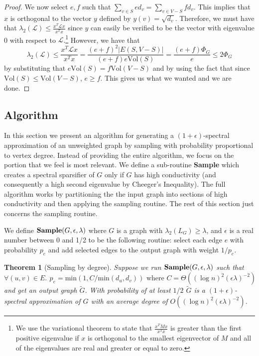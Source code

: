 \documentclass[12pt,twoside]{article}
\newtheorem{thm}{Theorem}
\begin{document}
\begin{proof}
We now select $e,f$ such that $\sum_{v \in S} e d_v = \sum_{v \in V-S} f d_v$. This implies that $x$ is orthogonal to the vector $y$ defined by $y(v) = \sqrt{d_v}$. Therefore, we must have that $\lambda_2(\mathcal{L}) \leq \frac{x^T \mathcal{L} x}{x^T x} $ since $y$ can easily be verified to be the vector with eigenvalue 0 with respect to $\mathcal{L}$.\footnote{We use the variational theorem to state that $\frac{x^T M x}{x^Tx}$ is greater than the first positive eigenvalue if $x$ is orthogonal to the smallest eigenvector of $M$ and all of the eigenvalues are real and greater or equal to zero.} However, we have that
%
\begin{equation}
\lambda_2(\mathcal{L}) \leq \frac{x^T\mathcal{L}x}{x^Tx}  
    = \frac{(e+f)^2|E(S,V-S)|}{(e + f)e\text{Vol}(S)}
    = \frac{(e+f)\Phi_G}{e} \leq 2\Phi_G
\end{equation}
%
by substituting that $e\text{Vol}(S) = f\text{Vol}(V-S)$ and by using the fact that since $\text{Vol}(S) \leq \text{Vol}(V - S)$, $e \geq f$. This gives us what we wanted and we are done.
 

\end{proof}


\subsection{Algorithm}

In this section we present an algorithm for generating a $(1+\epsilon)$-spectral approximation of an unweighted graph by sampling with probability proportional to vertex degree. Instead of providing the entire algorithm, we focus on the portion that we feel is most relevant. We define a sub-routine \textbf{Sample} which creates a spectral sparsifier of $G$ only if $G$ has high conductivity (and consequently a high second eigenvalue by Cheeger's Inequality). The full algorithm works by partitioning the the input graph into sections of high conductivity and then applying the sampling routine. The rest of this section just concerns the sampling routine.

We define $\text{\textbf{Sample}}(G, \epsilon, \lambda)$ where $G$ is a graph with $\lambda_2(L_G) \geq \lambda$, and $\epsilon$ is a real number between 0 and 1/2 to be the following routine: select each edge $e$ with probability $p_e$ and add selected edges to the output graph with weight $1/p_e$. 

\begin{thm}[Sampling by degree]
\label{thm:sample-by-degree}
Suppose we run $\normalfont{\textbf{Sample}}(G, \epsilon, \lambda)$ such that
%
\begin{equation*}
\forall (u,v) \in E.\:\, p_e = \text{min}(1, C/\text{min}(d_u, d_v)) \text{ where } C=\Theta((\log n)^2 (\epsilon\lambda)^{-2})
\end{equation*}
%
and get an output graph $\tilde{G}$.  With probability of at least $1/2$ $\tilde{G}$ is a $(1+\epsilon)$-spectral approximation of $G$ with an average degree of $O((\log n)^2 (\epsilon \lambda)^{-2})$. 
\end{thm}
\end{document}
